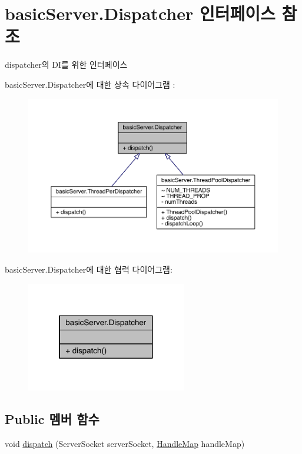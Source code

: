 \hypertarget{interfacebasic_server_1_1_dispatcher}{\section{basic\+Server.\+Dispatcher 인터페이스 참조}
\label{interfacebasic_server_1_1_dispatcher}
}


dispatcher의 D\+I를 위한 인터페이스  




basic\+Server.\+Dispatcher에 대한 상속 다이어그램 \+: 
\nopagebreak
\begin{figure}[H]
\begin{center}
\leavevmode
\includegraphics[width=350pt]{interfacebasic_server_1_1_dispatcher__inherit__graph}
\end{center}
\end{figure}


basic\+Server.\+Dispatcher에 대한 협력 다이어그램\+:\nopagebreak
\begin{figure}[H]
\begin{center}
\leavevmode
\includegraphics[width=198pt]{interfacebasic_server_1_1_dispatcher__coll__graph}
\end{center}
\end{figure}
\subsection*{Public 멤버 함수}
\begin{DoxyCompactItemize}
\item 
void \hyperlink{interfacebasic_server_1_1_dispatcher_a9a8d3e47b27a6161f8f39bf63fa9e198}{dispatch} (Server\+Socket server\+Socket, \hyperlink{classbasic_server_1_1_handle_map}{Handle\+Map} handle\+Map)
\end{DoxyCompactItemize}


